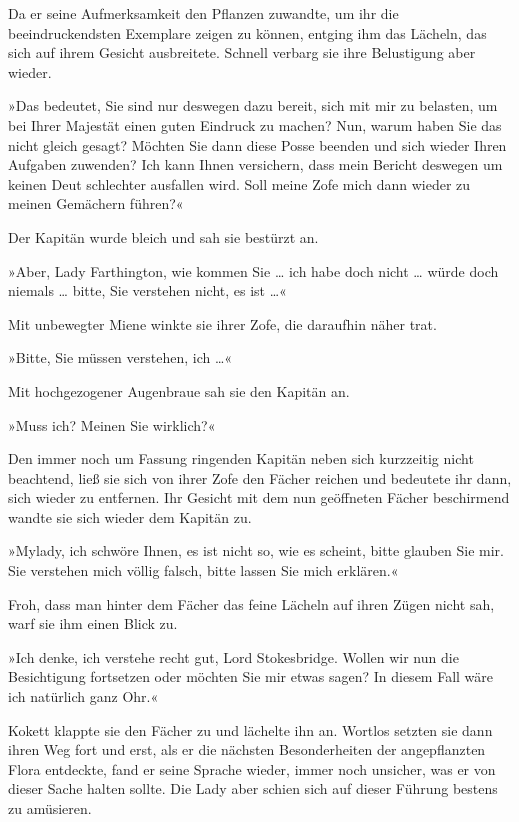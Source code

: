 Da er seine Aufmerksamkeit den Pflanzen zuwandte, um ihr die
beeindruckendsten Exemplare zeigen zu können, entging ihm das
Lächeln, das sich auf ihrem Gesicht ausbreitete. Schnell verbarg
sie ihre Belustigung aber wieder.

»Das bedeutet, Sie sind nur deswegen dazu bereit, sich mit mir zu
belasten, um bei Ihrer Majestät einen guten Eindruck zu machen?
Nun, warum haben Sie das nicht gleich gesagt? Möchten Sie dann
diese Posse beenden und sich wieder Ihren Aufgaben zuwenden? Ich
kann Ihnen versichern, dass mein Bericht deswegen um keinen Deut
schlechter ausfallen wird. Soll meine Zofe mich dann wieder zu
meinen Gemächern führen?«

Der Kapitän wurde bleich und sah sie bestürzt an.

»Aber, Lady Farthington, wie kommen Sie \ldots{} ich habe doch nicht \ldots{}
würde doch niemals \ldots{} bitte, Sie verstehen nicht, es ist \ldots{}«

Mit unbewegter Miene winkte sie ihrer Zofe, die daraufhin näher
trat.

»Bitte, Sie müssen verstehen, ich \ldots{}«

Mit hochgezogener Augenbraue sah sie den Kapitän an.

»Muss ich? Meinen Sie wirklich?«

Den immer noch um Fassung ringenden Kapitän neben sich kurzzeitig
nicht beachtend, ließ sie sich von ihrer Zofe den Fächer reichen
und bedeutete ihr dann, sich wieder zu entfernen. Ihr Gesicht mit
dem nun geöffneten Fächer beschirmend wandte sie sich wieder dem
Kapitän zu.

»Mylady, ich schwöre Ihnen, es ist nicht so, wie es scheint, bitte
glauben Sie mir. Sie verstehen mich völlig falsch, bitte lassen Sie
mich erklären.«

Froh, dass man hinter dem Fächer das feine Lächeln auf ihren Zügen
nicht sah, warf sie ihm einen Blick zu.

»Ich denke, ich verstehe recht gut, Lord Stokesbridge. Wollen wir
nun die Besichtigung fortsetzen oder möchten Sie mir etwas sagen?
In diesem Fall wäre ich natürlich ganz Ohr.«

Kokett klappte sie den Fächer zu und lächelte ihn an. Wortlos
setzten sie dann ihren Weg fort und erst, als er die nächsten
Besonderheiten der angepflanzten Flora entdeckte, fand er seine
Sprache wieder, immer noch unsicher, was er von dieser Sache halten
sollte. Die Lady aber schien sich auf dieser Führung bestens zu
amüsieren.


